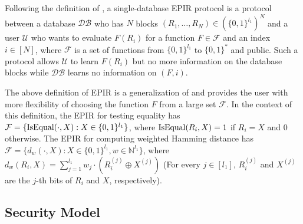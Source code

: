 \documentclass[JMC]{degruyter-journal}
\begin{document}
Following the definition of \cite{BC09}, a single-database EPIR
protocol is a protocol between a database $\mathcal{DB}$ who has $N$
blocks   $(R_1,\ldots, R_N)\in (\{0,1\}^{l_1})^{N}$ and a user
 $\mathcal{U}$ who wants to  evaluate  $F(R_i)$ for a function
$F\in \mathcal{F}$ and an index $i\in[N]$,  where $\mathcal{F}$ is a
 set of functions from $\{0,1\}^{l_1}$ to $\{0,1\}^{*}$ and public. Such a protocol allows
 $\mathcal{U}$ to learn $F(R_i)$ but no more information on the database blocks while $\mathcal{DB}$
learns no information on $(F,i)$.

The above definition of EPIR is a generalization of  \cite{BCPT07}
and provides the user with more flexibility of choosing the function
$F$ from a large set  $\mathcal{F}$.
 In the context of this definition, the EPIR
for testing equality  \cite{BCPT07} has  $\mathcal{F}=\{{\rm IsEqual}(\cdot, X):  X\in
\{0,1\}^{l_1}\}$, where ${\rm IsEqual}(R_i,X)=1$ if $R_i=X$ and 0
otherwise.
The
EPIR  for computing weighted Hamming distance \cite{BCPT07}
has $\mathcal{F}=\{d_w(\cdot, X):  X\in
\{0,1\}^{l_1}, w\in \mathbb{N}^{l_1}\}$, where
$d_w(R_i,X)=\sum_{j=1}^{l_1} w_j\cdot (R_i^{(j)}\oplus X^{(j)})$
 (For every $j\in[l_1]$, $R_i^{(j)}$ and $X^{(j)}$ are the $j$-th bits of $R_i$ and
$X$, respectively).


\subsection{Security Model}\label{sec:security_model}
\end{document}

